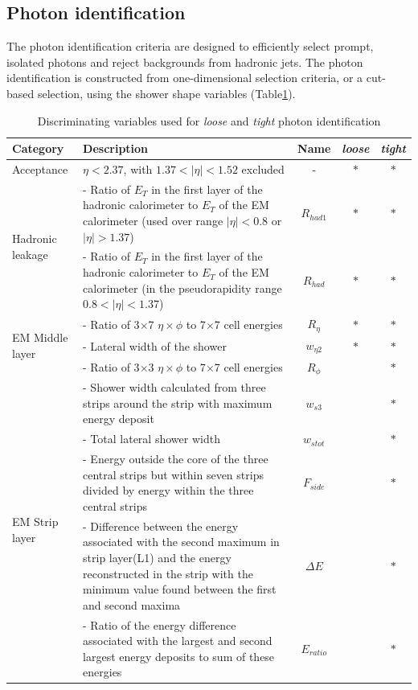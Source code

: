 \documentclass[a4paper, oneside]{book}
\begin{document}
			\subsection{Photon identification}
			\cite{El ph reco}The photon identification criteria are designed to efficiently select prompt, isolated photons and reject backgrounds from hadronic jets. The photon identification is constructed from one-dimensional selection criteria, or a cut-based selection, using the shower shape variables (Table\ref{tab:ph parameters}).

			\begin{table}[h!]
				\centering
				\begin{tabular}{lp{6cm}ccc}
					\toprule[1.5pt]
					\textbf{Category} & \textbf{Description} & \textbf{Name} & \textbf{\textit{loose}} & \textbf{\textit{tight}}\\
					\midrule
					Acceptance & $\eta<2.37$, with $1.37<|\eta|<1.52$ excluded & - & $\ast$ & $\ast$ \\
					\midrule
					\multirow[t]{2}{*}{Hadronic leakage} 
					& {- Ratio of $E_T$ in the first layer of the hadronic calorimeter to $E_T$ of the EM calorimeter (used over range $|\eta| < 0.8$ or $|\eta| > 1.37$)} & $R_{had1}$ & $\ast$ & $\ast$  \\ 
					& - Ratio of $E_T$ in the first layer of the hadronic calorimeter to $E_T$ of the EM calorimeter (in the pseudorapidity range $0.8 < |\eta| < 1.37$) & $R_{had}$  & $\ast$ & $\ast$ \\
					\midrule
					\multirow[t]{3}{*}{EM Middle layer}
					& - Ratio of 3$\times$7 $\eta\times\phi$ to 7$\times$7 cell energies & $R_{\eta}$ & $\ast$ & $\ast$ \\
					& - Lateral width of the shower & $w_{\eta2}$ & $\ast$ & $\ast$ \\
					& - Ratio of 3$\times$3 $\eta\times\phi$ to 7$\times$7 cell energies & $R_{\phi}$ &  & $\ast$ \\
					\midrule
					\multirow[t]{5}{*}{EM Strip layer}
					& - Shower width calculated from three strips around the strip with maximum energy deposit & $w_{s3}$ &  & $\ast$ \\
					& - Total lateral shower width & $w_{stot}$ &  & $\ast$ \\
					& - Energy outside the core of the three central strips but within seven strips divided by energy within the three central strips & $F_{side}$ &  & $\ast$ \\
					& - Difference between the energy associated with the second maximum in strip layer(L1) and the energy reconstructed in the strip with the minimum value found between the first and second maxima & $\Delta E$ &  & $\ast$ \\
					& - Ratio of the energy difference associated with the largest and second largest energy deposits to sum of these energies & $E_{ratio}$ &  & $\ast$ \\
					
					\bottomrule[1.5pt]
				\end{tabular}
				\caption{Discriminating variables used for \textit{loose} and \textit{tight} photon identification \cite{Identification}}
				\label{tab:ph parameters}
			\end{table}
		
\end{document}
